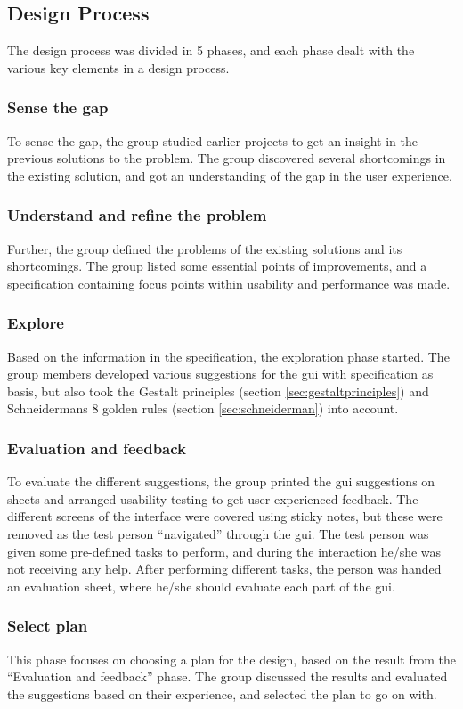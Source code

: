 \subsection{Design Process}
\label{sec:hcimethod}
The design process was divided in 5 phases, and each phase dealt with the various key elements in a design process.

\subsubsection{Sense the gap}
\label{sec:sensethegap}
To sense the gap, the group studied earlier projects to get an insight in the previous solutions to the problem. The group discovered several shortcomings in the existing solution, and got an understanding of the gap in the user experience.

\subsubsection{Understand and refine the problem}
Further, the group defined the problems of the existing solutions and its shortcomings. The group listed some essential points of improvements, and a specification containing focus points within usability and performance was made.

\subsubsection{Explore}
\label{sec:explore}
Based on the information in the specification, the exploration phase started. The group members developed various suggestions for the \acrshort{gui} with specification as basis, but also took the Gestalt principles (section \ref{sec:gestaltprinciples}) and Schneidermans 8 golden rules (section \ref{sec:schneiderman}) into account.

\subsubsection{Evaluation and feedback}
\label{sec:evalandfeedback}
To evaluate the different suggestions, the group printed the \acrshort{gui} suggestions on sheets and arranged usability testing to get user-experienced feedback. The different screens of the interface were covered using sticky notes, but these were removed as the test person ``navigated'' through the \acrshort{gui}. The test person was given some pre-defined tasks to perform, and during the interaction he/she was not receiving any help. After performing different tasks, the person was handed an evaluation sheet, where he/she should evaluate each part of the \acrshort{gui}.

\subsubsection{Select plan}
\label{sec:selectplan}
This phase focuses on choosing a plan for the design, based on the result from the ``Evaluation and feedback'' phase. The group discussed the results and evaluated the suggestions based on their experience, and selected the plan to go on with.